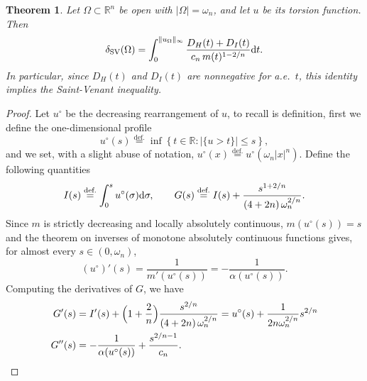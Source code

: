 \documentclass[11pt]{amsart}
\newcommand{\theoname}{Theorem}
\theoremstyle{plain}
\newtheorem{theorem}{\theoname}[section]
\theoremstyle{definition}
\newcommand{\eqdef}{\overset{\text{def.}}{=}}
\def\dd{{\rm d}}
\newcommand\SV{\mathop{\rm SV}}
\begin{document}
\begin{theorem}\label{thm.SaintVenant_qualitative}
  Let $\Omega\subset\mathbb{R}^n$ be open with $|\Omega|=\omega_n$, and let $u$
be its torsion function. Then
\[
  \delta_{\SV}(\Omega)=\int_0^{\|u_\Omega\|_\infty}
  \frac{D_H(t)+D_I(t)}{c_n\,m(t)^{1-2/n}}\dd t .
\]
In particular, since $D_H(t)$ and $D_I(t)$ are nonnegative for a.e.~$t$, this identity implies the Saint-Venant inequality.
\end{theorem}
\begin{proof}
  Let $u^\circ$ be the decreasing rearrangement of $u$, to recall is definition, first we define the one-dimensional profile
  \[
    u^\circ(s) 
    \eqdef 
    \inf 
    \left\{
        t \in \mathbb{R}: 
        |\{u > t\}| \le s
    \right\},
  \]
  and we set, with a slight abuse of notation, $u^\circ (x) \eqdef u^\circ(\omega_n|x|^n)$. Define the following quantities
\[
  I(s)\eqdef\int_0^s u^\circ(\sigma)\dd \sigma,\qquad
  G(s)\eqdef I(s)+\frac{s^{1+2/n}}{(4+2n)\,\omega_n^{2/n}} .
\]
Since $m$ is strictly decreasing and locally absolutely continuous,
$m(u^\circ(s))=s$ and the theorem on inverses of monotone absolutely
continuous functions gives, for almost every $s\in(0,\omega_n)$,
\[
  (u^\circ)'(s)=\frac{1}{m'(u^\circ(s))}=-\frac{1}{\alpha(u^\circ(s))}.
\]
Computing the derivatives of $G$, we have
\begin{align*}
  G'(s) &=I'(s)+\Bigl(1+\frac{2}{n}\Bigr)\frac{s^{2/n}}{(4+2n)\,\omega_n^{2/n}}
         = u^\circ(s)+ \frac{1}{2n \omega_n^{2/n}} s^{2/n}\\
  G''(s)&=-\frac{1}{\alpha(u^\circ(s))}+\frac{s^{2/n-1}}{c_n}.
\end{align*}


\end{proof}
\end{document}
